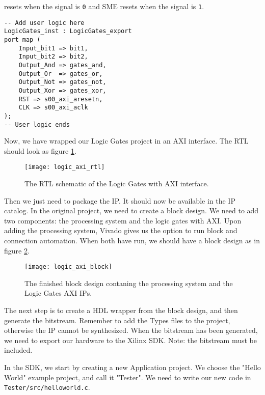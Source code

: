 resets when the signal is \texttt{0} and SME resets when the signal is
\texttt{1}.
\begin{lstlisting}
-- Add user logic here
LogicGates_inst : LogicGates_export
port map (
    Input_bit1 => bit1,
    Input_bit2 => bit2,
    Output_And => gates_and,
    Output_Or  => gates_or,
    Output_Not => gates_not,
    Output_Xor => gates_xor,
    RST => s00_axi_aresetn,
    CLK => s00_axi_aclk
);
-- User logic ends
\end{lstlisting}
Now, we have wrapped our Logic Gates project in an AXI interface. The RTL
should look as figure \ref{fig:logic-axi-rtl}.
\begin{figure}
    \texttt{[image: logic\_axi\_rtl]}
    \caption{The RTL schematic of the Logic Gates with AXI interface.}
    \label{fig:logic-axi-rtl}
\end{figure}
Then we just need to package the IP. It should now be available in the IP
catalog. In the original project, we need to create a block design. We need to
add two components: the processing system and the logic gates with AXI. Upon
adding the processing system, Vivado gives us the option to run block and
connection automation. When both have run, we should have a block design as
in figure \ref{fig:logic-axi-block}.
\begin{figure}
    \texttt{[image: logic\_axi\_block]}
    \caption{The finished block design contaning the processing system and the
    Logic Gates AXI IPs.}
    \label{fig:logic-axi-block}
\end{figure}
The next step is to create a HDL wrapper from the block design, and then
generate the bitstream. Remember to add the Types files to the project,
otherwise the IP cannot be synthesized. When the bitstream has been generated,
we need to export our hardware to the Xilinx SDK. Note: the bitstream must be
included.

In the SDK, we start by creating a new Application project. We choose the
"Hello World" example project, and call it "Tester". We need to write our new
code in \texttt{Tester/src/helloworld.c}.

